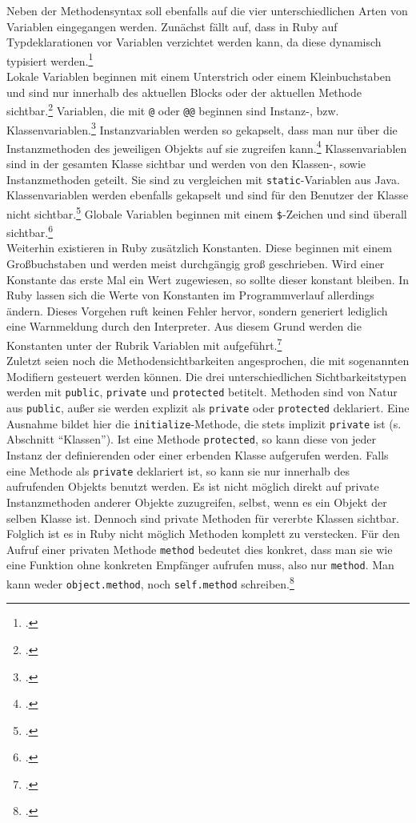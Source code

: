 \documentclass[a4paper, 11pt]{scrreprt}
\begin{document}
\inputminted[]{ruby}{method.rb}

Neben der Methodensyntax soll ebenfalls auf die vier unterschiedlichen Arten von Variablen eingegangen werden. Zunächst fällt auf, dass in Ruby auf Typdeklarationen vor Variablen verzichtet werden kann, da diese dynamisch typisiert werden.\footcite[vgl.][S.324]{p_ruby}
\\ 
Lokale Variablen beginnen mit einem Unterstrich oder einem Kleinbuchstaben und sind nur innerhalb des aktuellen Blocks oder der aktuellen Methode sichtbar.\footcite[vgl.][S.87]{ruby_lang} Variablen, die mit \texttt{@} oder \texttt{@@} beginnen sind Instanz-, bzw. Klassenvariablen.\footcite[vgl.][S.87]{ruby_lang}
Instanzvariablen werden so gekapselt, dass man nur über die Instanzmethoden des jeweiligen Objekts auf sie zugreifen kann.\footcite[vgl.][S.216]{ruby_lang}
Klassenvariablen sind in der gesamten Klasse sichtbar und werden von den Klassen-, sowie Instanzmethoden geteilt. Sie sind zu vergleichen mit \texttt{static}-Variablen aus Java. Klassenvariablen werden ebenfalls gekapselt und sind für den Benutzer der Klasse nicht sichtbar.\footcite[vgl.][S.230]{ruby_lang}
Globale Variablen beginnen mit einem \texttt{\$}-Zeichen und sind überall sichtbar.\footcite[vgl.][S.87]{ruby_lang}\\
Weiterhin existieren in Ruby zusätzlich Konstanten. Diese beginnen mit einem Großbuchstaben und werden meist durchgängig groß geschrieben. Wird einer Konstante das erste Mal ein Wert zugewiesen, so sollte dieser konstant bleiben. In Ruby lassen sich die Werte von Konstanten im Programmverlauf allerdings ändern. Dieses Vorgehen ruft keinen Fehler hervor, sondern generiert lediglich eine Warnmeldung durch den Interpreter. Aus diesem Grund werden die Konstanten unter der Rubrik Variablen mit aufgeführt.\footcite[vgl.][S.324]{p_ruby}\\
Zuletzt seien noch die Methodensichtbarkeiten angesprochen, die mit sogenannten Modifiern gesteuert werden können. Die drei unterschiedlichen Sichtbarkeitstypen werden mit \texttt{public}, \texttt{private} und \texttt{protected} betitelt. Methoden sind von Natur aus \texttt{public}, außer sie werden explizit als \texttt{private} oder \texttt{protected} deklariert. Eine Ausnahme bildet hier die \texttt{initialize}-Methode, die stets implizit \texttt{private} ist (s. Abschnitt ``Klassen''). Ist eine Methode \texttt{protected}, so kann diese von jeder Instanz der definierenden oder einer erbenden Klasse aufgerufen werden. Falls eine Methode als \texttt{private} deklariert ist, so kann sie nur innerhalb des aufrufenden Objekts benutzt werden. Es ist nicht möglich direkt auf private Instanzmethoden anderer Objekte zuzugreifen, selbst, wenn es ein Objekt der selben Klasse ist. Dennoch sind private Methoden für vererbte Klassen sichtbar. Folglich ist es in Ruby nicht möglich Methoden komplett zu verstecken. Für den Aufruf einer privaten Methode \texttt{method} bedeutet dies konkret, dass man sie wie eine Funktion ohne konkreten Empfänger aufrufen muss, also nur \texttt{method}. Man kann weder \texttt{object.method}, noch \texttt{self.method} schreiben.\footcite[vgl.][S.232-234]{ruby_lang}
\end{document}
